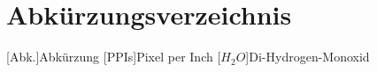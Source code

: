 
\chapter*{Abkürzungsverzeichnis}

\begin{acronym}[DHBW]
    [Abk.]{Abkürzung}
    [PPIs]{Pixel per Inch}
    [\ensuremath{H_2O}]{Di-Hydrogen-Monoxid}
\end{acronym}
